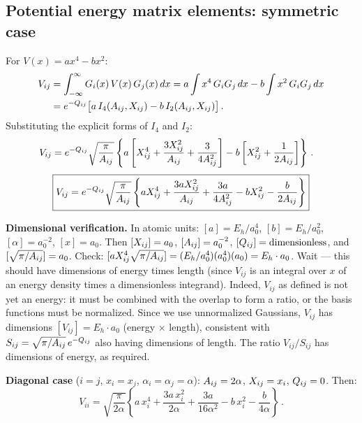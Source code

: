 \subsection{Potential energy matrix elements: symmetric case}\label{sec:Gauss_V_sym}

For $V(x) = ax^4 - bx^2$:
\begin{align}
  V_{ij} &= \int_{-\infty}^{\infty}G_i(x)\,V(x)\,G_j(x)\,dx
  = a\int x^4\,G_i G_j\,dx - b\int x^2\,G_i G_j\,dx\notag\\
  &= e^{-Q_{ij}}\bigl[a\,I_4(A_{ij},X_{ij}) - b\,I_2(A_{ij},X_{ij})\bigr]\,.
\end{align}
Substituting the explicit forms of $I_4$ and $I_2$:
\begin{align}\label{eq:Vij_sym}
  V_{ij} &= e^{-Q_{ij}}\sqrt{\frac{\pi}{A_{ij}}}\left\{
    a\left[X_{ij}^4 + \frac{3X_{ij}^2}{A_{ij}} + \frac{3}{4A_{ij}^2}\right]
    - b\left[X_{ij}^2 + \frac{1}{2A_{ij}}\right]
  \right\}\,.
\end{align}
\begin{equation}\label{eq:Vij_sym_boxed}
  \boxed{V_{ij} = e^{-Q_{ij}}\sqrt{\frac{\pi}{A_{ij}}}\left\{
    aX_{ij}^4 + \frac{3aX_{ij}^2}{A_{ij}} + \frac{3a}{4A_{ij}^2}
    - bX_{ij}^2 - \frac{b}{2A_{ij}}
  \right\}}
\end{equation}

\textbf{Dimensional verification.} In atomic units:
$[a] = E_h/a_0^4$, $[b] = E_h/a_0^2$, $[\alpha] = a_0^{-2}$, $[x] = a_0$.
Then $[X_{ij}] = a_0$, $[A_{ij}] = a_0^{-2}$, $[Q_{ij}] = \text{dimensionless}$, and
$[\sqrt{\pi/A_{ij}}] = a_0$. Check: $[aX_{ij}^4\sqrt{\pi/A_{ij}}] = (E_h/a_0^4)(a_0^4)(a_0) = E_h\cdot a_0$.
Wait --- this should have dimensions of energy times length (since $V_{ij}$ is an integral
over $x$ of an energy density times a dimensionless integrand). Indeed, $V_{ij}$ as defined
is not yet an energy: it must be combined with the overlap to form a ratio, or the basis
functions must be normalized. Since we use unnormalized Gaussians, $V_{ij}$ has dimensions
$[V_{ij}] = E_h \cdot a_0$ (energy $\times$ length), consistent with $S_{ij} = \sqrt{\pi/A_{ij}}\,e^{-Q_{ij}}$
also having dimensions of length. The ratio $V_{ij}/S_{ij}$ has dimensions of energy, as required.

\textbf{Diagonal case} ($i = j$, $x_i = x_j$, $\alpha_i = \alpha_j = \alpha$):
$A_{ij} = 2\alpha$, $X_{ij} = x_i$, $Q_{ij} = 0$. Then:
\begin{equation}
  V_{ii} = \sqrt{\frac{\pi}{2\alpha}}\left\{
    a\,x_i^4 + \frac{3a\,x_i^2}{2\alpha} + \frac{3a}{16\alpha^2}
    - b\,x_i^2 - \frac{b}{4\alpha}
  \right\}\,.
\end{equation}

